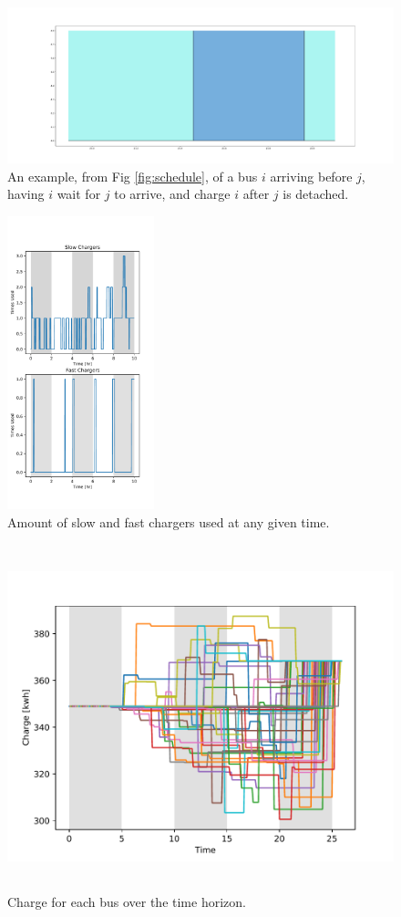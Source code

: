 \documentclass[letterpaper, 10pt, conference]{IEEEtran}
\begin{document}
\begin{figure}[h]
	\centering
	\includegraphics[trim=0in 1in 0in 1in, width=\linewidth]{unoptimal.pdf}
	\caption{An example, from Fig \ref{fig:schedule}, of a bus $i$ arriving before $j$, having $i$ wait for $j$ to arrive, and charge $i$ after $j$ is detached.}
	\label{fig:unoptimal}
\end{figure}

\begin{figure}[h!]
	\centering
	\includegraphics[trim=0in 0.5in 0in 1in, width=\linewidth, height=8.5cm]{usage.pdf}
	\caption{Amount of slow and fast chargers used at any given time.}
	\label{fig:usage}
\end{figure}

\begin{figure}[h]
	\centering
	\includegraphics[trim= 0in 0in 0in 0.25in, width=\linewidth, height=10cm]{charges.pdf}
	\caption{Charge for each bus over the time horizon.}
	\label{fig:charges}
\end{figure}
\end{document}
